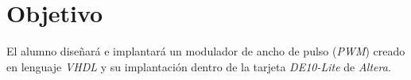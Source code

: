 \documentclass[../main.tex]{subfiles}
\begin{document}
\section{Objetivo}
El alumno diseñará e implantará un modulador de ancho de pulso (\textit{PWM})
creado en lenguaje \textit{VHDL} y su implantación dentro de la tarjeta 
\textit{DE10-Lite} de \textit{Altera}.
\end{document}
